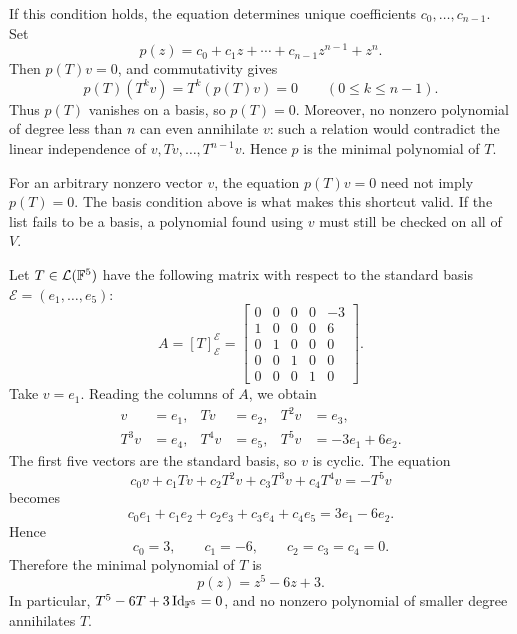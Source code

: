 If this condition holds, the equation determines unique
coefficients $c_0,\ldots,c_{n-1}$. Set
\[
  p(z)=c_0+c_1z+\cdots+c_{n-1}z^{n-1}+z^n.
\]
Then $p(T)v=0$, and commutativity gives
\[
  p(T)(T^kv)=T^k(p(T)v)=0\qquad(0\leq k\leq n-1).
\]
Thus $p(T)$ vanishes on a basis, so $p(T)=0$. Moreover, no nonzero
polynomial of degree less than $n$ can even annihilate $v$:
such a relation would contradict the linear independence of
$v,Tv,\ldots,T^{n-1}v$. Hence $p$ is the minimal polynomial of $T$.

\begin{remark}
  For an arbitrary nonzero vector $v$, the equation $p(T)v=0$
  need not imply $p(T)=0$. The basis condition above is what makes
  this shortcut valid. If the list fails to be a basis, a
  polynomial found using $v$ must still be checked on all of $V$.
\end{remark}

\begin{example}\label{ex:minimal-polynomial-cyclic-matrix}
  Let $T\in\mathcal L(\mathbb{F}^5)$ have the following matrix with
  respect to the standard basis $\mathcal E=(e_1,\ldots,e_5)$:
  \[
    A=[T]_{\mathcal E}^{\mathcal E}
      =\begin{bmatrix}
        0&0&0&0&-3\\
        1&0&0&0&6\\
        0&1&0&0&0\\
        0&0&1&0&0\\
        0&0&0&1&0
      \end{bmatrix}.
  \]
  Take $v=e_1$. Reading the columns of $A$, we obtain
  \begin{align*}
    v&=e_1, & Tv&=e_2, & T^2v&=e_3,\\
    T^3v&=e_4, & T^4v&=e_5, & T^5v&=-3e_1+6e_2.
  \end{align*}
  The first five vectors are the standard basis, so $v$ is cyclic.
  The equation
  \[
    c_0v+c_1Tv+c_2T^2v+c_3T^3v+c_4T^4v=-T^5v
  \]
  becomes
  \[
    c_0e_1+c_1e_2+c_2e_3+c_3e_4+c_4e_5=3e_1-6e_2.
  \]
  Hence
  \[
    c_0=3,\qquad c_1=-6,\qquad c_2=c_3=c_4=0.
  \]
  Therefore the minimal polynomial of $T$ is
  \[
    \boxed{p(z)=z^5-6z+3}.
  \]
  In particular, $T^5-6T+3\operatorname{Id}_{\mathbb{F}^5}=0$,
  and no nonzero polynomial of smaller degree annihilates $T$.
\end{example}
